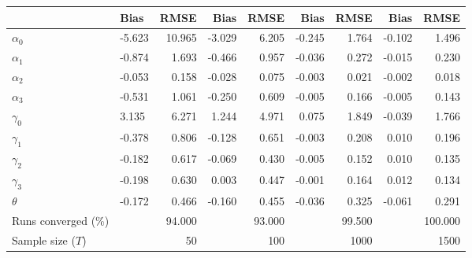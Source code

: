 
\begin{tabular}[t]{llrrrrrrr}
\toprule
  & Bias & RMSE & Bias & RMSE & Bias & RMSE & Bias & RMSE\\
\midrule
$\alpha_{0}$ & -5.623 & 10.965 & -3.029 & 6.205 & -0.245 & 1.764 & -0.102 & 1.496\\
$\alpha_{1}$ & -0.874 & 1.693 & -0.466 & 0.957 & -0.036 & 0.272 & -0.015 & 0.230\\
$\alpha_{2}$ & -0.053 & 0.158 & -0.028 & 0.075 & -0.003 & 0.021 & -0.002 & 0.018\\
$\alpha_{3}$ & -0.531 & 1.061 & -0.250 & 0.609 & -0.005 & 0.166 & -0.005 & 0.143\\
$\gamma_{0}$ & 3.135 & 6.271 & 1.244 & 4.971 & 0.075 & 1.849 & -0.039 & 1.766\\
$\gamma_{1}$ & -0.378 & 0.806 & -0.128 & 0.651 & -0.003 & 0.208 & 0.010 & 0.196\\
$\gamma_{2}$ & -0.182 & 0.617 & -0.069 & 0.430 & -0.005 & 0.152 & 0.010 & 0.135\\
$\gamma_{3}$ & -0.198 & 0.630 & 0.003 & 0.447 & -0.001 & 0.164 & 0.012 & 0.134\\
$\theta$ & -0.172 & 0.466 & -0.160 & 0.455 & -0.036 & 0.325 & -0.061 & 0.291\\
Runs converged (\%) &  & 94.000 &  & 93.000 &  & 99.500 &  & 100.000\\
Sample size ($T$) &  & 50 &  & 100 &  & 1000 &  & 1500\\
\bottomrule
\end{tabular}
